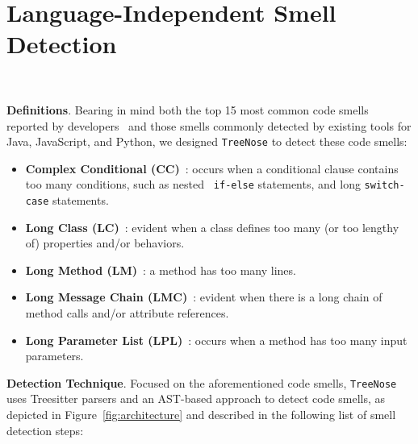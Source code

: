 


\vspace*{-0.5em}

\section{Language-Independent Smell Detection}~\label{sec:approach}

\vspace*{-1em}


{\bf Definitions}. Bearing in mind both the top 15 most common code smells
reported by developers~\cite{developersCare} and those smells commonly detected
by existing tools for Java, JavaScript, and Python, we designed
\texttt{TreeNose} to detect these code smells:

\begin{itemize}[leftmargin=*]
    \item \textbf{Complex Conditional (CC)}~\cite{Fowler_Beck}: occurs when
        a conditional clause contains too many conditions, such as nested {\tt
        if-else} statements, and long {\tt switch-case} statements.
    \item \textbf{Long Class (LC)}~\cite{Fowler_Beck}: evident when a class
        defines too many (or too lengthy of) properties and/or behaviors.
    \item \textbf{Long Method (LM)}~\cite{Fowler_Beck}: a method has too
        many lines.
    \item \textbf{Long Message Chain (LMC)}~\cite{Fowler_Beck}: evident when
        there is a long chain of method calls and/or attribute references.
    \item \textbf{Long Parameter List (LPL)}~\cite{Fowler_Beck}: occurs when
        a method has too many input parameters.
\end{itemize}


{\bf Detection Technique}. Focused on the aforementioned code smells,
\texttt{TreeNose} uses Treesitter parsers and an AST-based approach to detect
code smells, as depicted in Figure~\ref{fig:architecture} and described in the
following list of smell detection steps:

